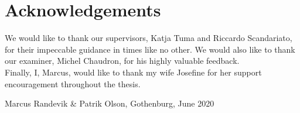 \thispagestyle{plain}			%
\section*{Acknowledgements}
We would like to thank our supervisors, Katja Tuma and Riccardo Scandariato, for their impeccable guidance in times like no other. We would also like to thank our examiner, Michel Chaudron, for his highly valuable feedback.\\

Finally, I, Marcus, would like to thank my wife Josefine for her support encouragement throughout the thesis.

\vspace{1.5cm}
\hfill
Marcus Randevik \& Patrik Olson, Gothenburg, June 2020

\newpage				%
\thispagestyle{empty}
\mbox{}